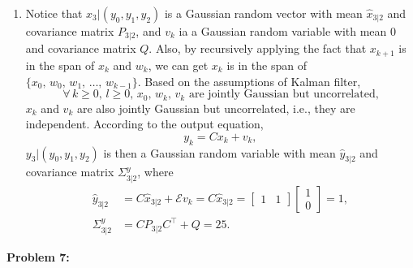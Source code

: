 \documentclass[letterpaper]{article}
\begin{document}
\begin{enumerate}
\item Notice that $x_{3}{\big|(y_0, y_1, y_2)}$ is a Gaussian random vector with mean $\widehat{x}_{3|2}$ and covariance matrix $P_{3|2}$, and $v_k$ ia a Gaussian random variable with mean $0$ and covariance matrix $Q$. Also, by recursively applying the fact that $x_{k+1}$ is in the span of $x_{k}$ and $w_{k}$, we can get $x_{k}$ is in the span of $\{x_{0},\, w_{0},\, w_{1},\,\ldots,\, w_{k-1}\}$. Based on the assumptions of Kalman filter,
    \begin{equation*}
      \forall\, k\ge 0,\,l\ge 0,\, x_{0},\, w_{k},\,v_{k} \textrm{ are jointly Gaussian but uncorrelated,}
    \end{equation*}
    $x_k$ and $v_k$ are also jointly Gaussian but uncorrelated, i.e., they are independent.
    According to the output equation,
    \begin{equation*}
      y_k =   C x_k + v_k,
    \end{equation*}
    $y_{3}{\big|(y_0, y_1, y_2)}$ is then a Gaussian random variable with mean $\widehat{y}_{3|2}$ and covariance matrix $\Sigma^y_{3|2}$, where
    \begin{align*}
        \widehat{y}_{3|2} & =C\widehat{x}_{3|2}+\mathcal{E} v_k=C\widehat{x}_{3|2}=\left[ \begin{array}{cc} 1 & 1\end{array} \right]\left[ \begin{array}{c} 1 \\ 0\end{array} \right]=1,\\
        \Sigma^y_{3|2} & =CP_{3|2}C^\top+Q=25.
    \end{align*}


\end{enumerate}

\newpage


\newpage
\noindent \textbf{Problem 7:}
\end{document}
